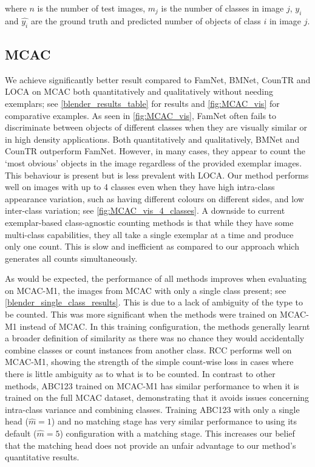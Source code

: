 \documentclass[runningheads]{llncs}
\begin{document}
\noindent {} where $n$ is the number of test images, $m_j$ is the number of classes in image $j$, $y_i$ and $\hat{y_i}$ are the ground truth and predicted number of objects of class $i$ in image $j$.


\subsection{MCAC}
We achieve significantly better result compared to FamNet, BMNet, CounTR and LOCA on MCAC both quantitatively and qualitatively without needing exemplars; see \cref{blender_results_table} for results and \cref{fig:MCAC_vis} for comparative examples.
As seen in \cref{fig:MCAC_vis}, FamNet often fails to discriminate between objects of different classes when they are visually similar or in high density applications.
Both quantitatively and qualitatively, BMNet and CounTR outperform FamNet. However, in many cases, they appear to count the `most obvious' objects in the image regardless of the provided exemplar images.
This behaviour is present but is less prevalent with LOCA.
Our method performs well on images with up to 4 classes even when they have high intra-class appearance variation, such as having different colours on different sides, and low inter-class variation; see \cref{fig:MCAC_vis_4_classes}.
A downside to current exemplar-based class-agnostic counting methods is that while they have some multi-class capabilities, they all take a single exemplar at a time and produce only one count. This is slow and inefficient as compared to our approach which generates all counts simultaneously.

As would be expected, the performance of all methods improves when evaluating on MCAC-M1, the images from MCAC with only a single class present; see \cref{blender_single_class_results}. This is due to a lack of ambiguity of the type to be counted. This was more significant when the methods were trained on MCAC-M1 instead of MCAC. In this training configuration, the methods generally learnt a broader definition of similarity as there was no chance they would accidentally combine classes or count instances from another class.
RCC performs well on MCAC-M1, showing the strength of the simple count-wise loss in cases where there is little ambiguity as to what is to be counted.
In contrast to other methods, ABC123 trained on MCAC-M1 has similar performance to when it is trained on the full MCAC dataset, demonstrating that it avoids issues concerning intra-class variance and combining classes. Training ABC123 with only a single head ($\hat{m}=1$) and no matching stage has very similar performance to using its default ($\hat{m}=5$) configuration with a matching stage. This increases our belief that the matching head does not provide an unfair advantage to our method's quantitative results.
\end{document}
